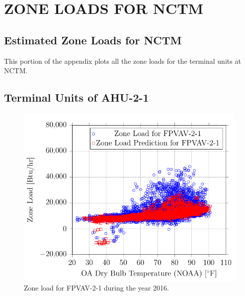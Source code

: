 %
%
%


\chapter{\texorpdfstring{\MakeUppercase{ZONE LOADS FOR NCTM}}{Zone Loads
for NCTM}}

\section{Estimated Zone Loads for NCTM}

This portion of the appendix plots all the zone loads for the terminal
units at NCTM. 

\newcommand{\zoneLoadAppendixPlotsCaption}[1]{Zone load for #1 during
the year 2016.}

\section{Terminal Units of AHU-2-1}
\begin{figure}
    \centering
    \includegraphics{Plots/04/2017-06-27-0830-BtuhrvsOADryBulbTemperatureNOAAF.pdf}
    \caption{\zoneLoadAppendixPlotsCaption{FPVAV-2-1}}
    \label{fig:2017-06-27-0830-BtuhrvsOADryBulbTemperatureNOAAF}
\end{figure}

